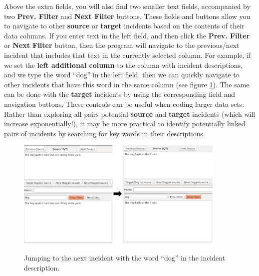 \documentclass{memoir}
\begin{document}
Above the extra fields, you will also find two smaller text fields, accompanied by two \textbf{Prev. Filter} and \textbf{Next Filter} buttons. These fields and buttons allow you to navigate to other \textbf{source} or \textbf{target} incidents based on the contents of their data columns. If you enter text in the left field, and then click the \textbf{Prev. Filter} or \textbf{Next Filter} button, then the program will navigate to the previous/next incident that includes that text in the currently selected column. For example, if we set the \textbf{left additional column} to the column with incident descriptions, and we type the word ``dog'' in the left field, then we can quickly navigate to other incidents that have this word in the same column (see figure \ref{fig:filternext}). The same can be done with the \textbf{target} incidents by using the corresponding field and navigation buttons. These controls can be useful when coding larger data sets: Rather than exploring all pairs potential \textbf{source} and \textbf{target} incidents (which will increase exponentially!), it may be more practical to identify potentially linked pairs of incidents by searching for key words in their descriptions.

\begin{figure}[h!]
  \centering
  \caption{Jumping to the next incident with the word ``dog'' in the incident description.}
  \includegraphics[width=100mm]{Screenshot_22.pdf}
  \label{fig:filternext}
\end{figure}
\end{document}

